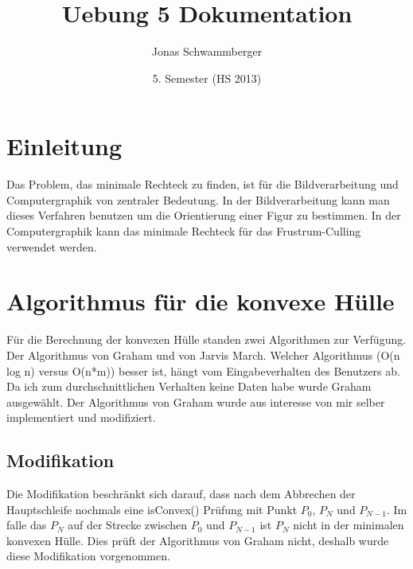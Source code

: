 \documentclass[10pt]{article}
\title{
	\vspace{5cm}
	Uebung 5 Dokumentation
}
\author{Jonas Schwammberger}
\date{5. Semester (HS 2013)}
\begin{document}
\maketitle
\thispagestyle{fancy}

\newpage

\tableofcontents	  	


\newpage
\setcounter{page}{1}


\section{Einleitung}
Das Problem, das minimale Rechteck zu finden, ist für die Bildverarbeitung und Computergraphik von zentraler Bedeutung. In der Bildverarbeitung kann man dieses Verfahren benutzen um die Orientierung einer Figur zu bestimmen. In der Computergraphik kann das minimale Rechteck für das Frustrum-Culling verwendet werden.

\section{Algorithmus für die konvexe Hülle}
Für die Berechnung der konvexen Hülle standen zwei Algorithmen zur Verfügung. Der Algorithmus von Graham und von Jarvis March. Welcher Algorithmus (O(n log n) versus O(n*m)) besser ist, hängt vom Eingabeverhalten des Benutzers ab. Da ich zum durchschnittlichen Verhalten keine Daten habe wurde Graham ausgewählt. Der Algorithmus von Graham wurde aus interesse von mir selber implementiert und modifiziert.

\subsection{Modifikation}
Die Modifikation beschränkt sich darauf, dass nach dem Abbrechen der Hauptschleife nochmals eine isConvex() Prüfung mit Punkt $P_{0}$, $P_N$ und $P_{N-1}$. Im falle das $P_N$ auf der Strecke zwischen $P_{0}$ und $P_{N-1}$ ist  $P_N$ nicht in der minimalen konvexen Hülle. Dies prüft der Algorithmus von Graham nicht, deshalb wurde diese Modifikation vorgenommen.
\end{document}
